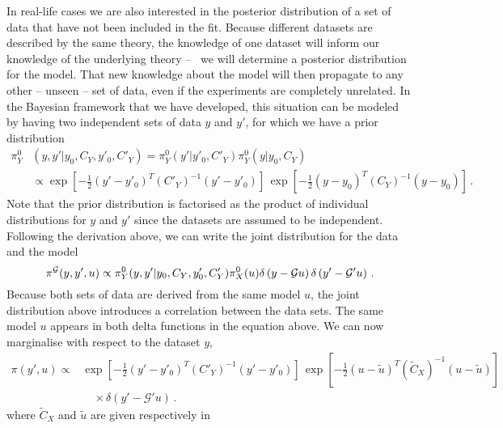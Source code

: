 In real-life cases we are also interested in the posterior distribution of a set
of data that have not been included in the fit. Because different datasets are
described by the same theory, the knowledge of one dataset will inform our
knowledge of the underlying theory -- \ie\ we will determine a posterior
distribution for the model. That new knowledge about the model will then
propagate to any other -- unseen -- set of data, even if the experiments are
completely unrelated. In the Bayesian framework that we have developed, this
situation can be modeled by having two independent sets of data $y$ and $y'$,
for which we have a prior distribution 
\begin{align}
  \label{eq:JointIndepDataPrior}
  \pi_{Y}^0&\left(y,y'|y_0,C_{Y},y'_0,C'_{Y}\right) 
   = \pi_{Y}^0\left(y'|y'_0,C'_{Y}\right) \pi_{Y}^0\left(y|y_0,C_{Y}\right) \\
  & \propto 
  \exp\left[-\frac12 \left(y'-y'_0\right)^T (C'_{Y})^{-1} 
  \left(y'-y'_0\right)\right]\, 
  \exp\left[-\frac12 \left(y-y_0\right)^T (C_{Y})^{-1} 
  \left(y-y_0\right)\right]\, .
\end{align}
Note that the prior distribution is factorised as the product of individual
distributions for $y$ and $y'$ since the datasets are assumed to be independent.
Following the derivation above, we can write the joint distribution for the data
and the model 
\begin{equation}
  \label{eq:JointModelData}
  \pi^{\mathcal{G}}(y,y',u) 
  \propto 
  \pi_{Y}^0(y,y'|y_0,C_{Y},y'_0,C'_{Y}) 
  \pi_{X}^0(u) 
  \delta\left(y - \mathcal{G}u\right)
  \delta\left(y'- \mathcal{G}'u\right)\, .
\end{equation}
Because both sets of data are derived from the same model $u$, the joint
distribution above introduces a correlation between the data sets. The same
model $u$ appears in both delta functions in the equation above. We can now
marginalise with respect to the dataset $y$, 
\begin{equation}
  \label{eq:MarginaliseDatasetY}
  \begin{split}
    \pi(y',u) 
    \propto &
    \exp\left[-\frac12 \left(y'-y'_0\right)^T (C'_{Y})^{-1} 
    \left(y'-y'_0\right)\right]\, 
    \exp\left[-\frac12 \left(u-\tilde{u}\right)^T (\tilde{C}_{X})^{-1} 
    \left(u-\tilde{u}\right)\right] \\
    & \quad \times \delta\left(y'- \mathcal{G}'u\right)\, .
  \end{split}
\end{equation}
where $\tilde{C}_{X}$ and $\tilde{u}$ are given respectively in
